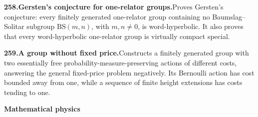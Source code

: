 \documentclass[11pt,a4paper]{article}
\begin{document}
  \par \begin{minipage}{\linewidth}
  \fontsize{10.5}{12.6}\selectfont\RaggedRight
  \hypertarget{result 258}{}
  {\bfseries\textcolor{muted}{258.}\enspace Gersten's conjecture for one-relator groups.}\enspace Proves Gersten's conjecture: every finitely generated one-relator group containing no Baumslag--Solitar subgroup $\mathrm{BS}(m,n)$, with $m,n\ne0$, is word-hyperbolic. It also proves that every word-hyperbolic one-relator group is virtually compact special.\par
  \end{minipage}\par\vspace{5pt}



  \par \begin{minipage}{\linewidth}
  \fontsize{10.5}{12.6}\selectfont\RaggedRight
  \hypertarget{result 259}{}
  {\bfseries\textcolor{muted}{259.}\enspace A group without fixed price.}\enspace Constructs a finitely generated group with two essentially free probability-measure-preserving actions of different costs, answering the general fixed-price problem negatively. Its Bernoulli action has cost bounded away from one, while a sequence of finite height extensions has costs tending to one.\par
  \end{minipage}\par\vspace{5pt}



  \par{}\addvspace{12pt}
  \hypertarget{subject 17}{}\label{subject 17}
  {\fontsize{15}{18}\selectfont\bfseries Mathematical physics\par}
  \nobreak\vspace{9pt}\nobreak
\end{document}

